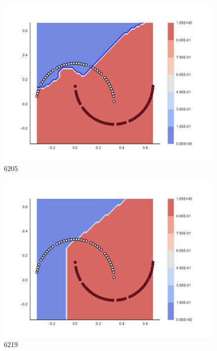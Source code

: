 \begin{subfigure}[b]{0.09\textwidth}
    \includegraphics[clip, trim=2.35cm 1.75cm 4.5cm 0cm,width=\textwidth]{img/convergence/6205.pdf}
    \caption{6205}
    \label{fig:convergence_6205}
\end{subfigure}
%
\begin{subfigure}[b]{0.09\textwidth}
    \includegraphics[clip, trim=2.35cm 1.75cm 4.5cm 0cm,width=\textwidth]{img/convergence/6219.pdf}
    \caption{6219}
    \label{fig:convergence_6219}
\end{subfigure}
%
